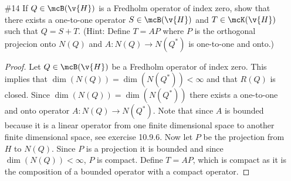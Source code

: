 \documentclass[11pt, oneside]{article}
\begin{document}
\begin{enumerate}
    \begin{proof}
      Let $T$ be a positive self-adjoint compact operator.
      Note that the eigenvalues of $T$ must all be nonnegative.
      To see this, let $u$ be an eigenvector of $T$ with eigenvalue $\lambda$,
      then
      \[
        0 < \abr{Tu, u} = \abr{\lambda u, u} = \lambda \norm{u}^2
      \]
      This implies that $\lambda \ge 0$, since $\norm{u}^2 \ge 0$.
      Also since $T$ is self-adjoint and compact, the set of eigenvectors make
      an orthonormal basis of $\v{H}$ and $T$ can be expressed as the following
      infinite sum
      \[
        T = \sum{n = 1}{\infty}{\lambda_n P_n}
      \]
      where $P_n$ is the projection operator onto the eigenvector $u_n$ and
      $\lambda_n$ is the corresponding eigenvalue.
      Since $\lambda_n \ge 0$ for all $n$, we can define the following operator.
      \[
        S = \sum{n = 1}{\infty}{\sqrt{\lambda} P_n}
      \]
      This operator is compact as can be seen by noting that
      \[
        S_N = \sum{n = 1}{N}{\sqrt{\lambda} P_n}
      \]
      is a sequence of compact operators that converge to $S$.
      That is $S_N \in \mcK(\v{H})$ as it has a finite dimensional range.
      Also $S_N \to S$ so $S \in \mcK(\v{H})$ as $\mcK(\v{H})$ is a closed
      subspace.

      Also $S$ is self adjoint because it is a sum of self-adjoint operators.
      Lastly $S^2 = T$ because $P_n P_n = P_n$ and $P_n P_m = 0$ when
      $n \neq m$.
    \end{proof}

  \item[\#14] %
    If $Q \in \mcB(\v{H})$ is a Fredholm operator of index zero, show that there
    exists a one-to-one operator $S \in \mcB(\v{H})$ and $T \in \mcK(\v{H})$
    such that $Q = S + T$.
    (Hint: Define $T = AP$ where $P$ is the orthogonal projecion onto $N(Q)$ and
    $A: N(Q) \to N(Q^*)$ is one-to-one and onto.)

    \begin{proof}
      Let $Q \in \mcB(\v{H})$ be a Fredholm operator of index zero.
      This implies that $\dim(N(Q)) = \dim(N(Q^*)) < \infty$ and that $R(Q)$
      is closed.
      Since $\dim(N(Q)) = \dim(N(Q^*))$ there exists a one-to-one and onto
      operator $A:N(Q) \to N(Q^*)$.
      Note that since $A$ is bounded because it is a linear operator from one
      finite dimensional space to another finite dimensional space, see
      exercise 10.9.6.
      Now let $P$ be the projection from $H$ to $N(Q)$.
      Since $P$ is a projection it is bounded and since $\dim(N(Q)) < \infty$,
      $P$ is compact.
      Define $T = AP$, which is compact as it is the composition of a bounded
      operator with a compact operator.


\end{proof}
\end{enumerate}
\end{document}
